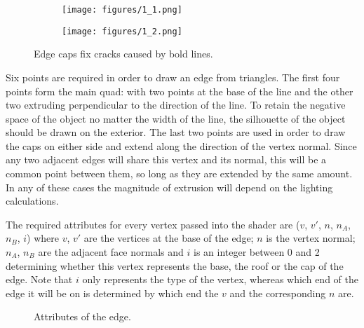 \documentclass[a4paper, 12pt]{article}
\begin{document}
\begin{figure}[htbp!]
  \centering
  \begin{subfigure}{0.2\columnwidth}
    \texttt{[image: figures/1\_1.png]}
  \end{subfigure}
  \begin{subfigure}{0.2\columnwidth}
    \texttt{[image: figures/1\_2.png]}
  \end{subfigure}
  \caption{Edge caps fix cracks caused by bold lines.}
  \label{cap}
\end{figure}

Six points are required in order to draw an edge from triangles. The first four points form the main quad: with two points at the base of the line and the other two extruding perpendicular to the direction of the line. To retain the negative space of the object no matter the width of the line, the silhouette of the object should be drawn on the exterior. The last two points are used in order to draw the caps on either side and extend along the direction of the vertex normal. Since any two adjacent edges will share this vertex and its normal, this will be a common point between them, so long as they are extended by the same amount. In any of these cases the magnitude of extrusion will depend on the lighting calculations.

The required attributes for every vertex passed into the shader are ($v$, $v'$, $n$, $n_A$, $n_B$, $i$) where $v$, $v'$ are the vertices at the base of the edge; $n$ is the vertex normal; $n_A$, $n_B$ are the adjacent face normals and $i$ is an integer between 0 and 2 determining whether this vertex represents the base, the roof or the cap of the edge. Note that $i$ only represents the type of the vertex, whereas which end of the edge it will be on is determined by which end the $v$ and the corresponding $n$ are.

\begin{figure}[htbp!]
  \centering
  \caption{Attributes of the edge.}
  \label{info}
\end{figure}
\end{document}
